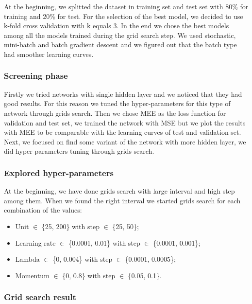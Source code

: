 At the beginning, we splitted the dataset in training set and test set with 80\% for training and 20\% for test. For the selection of the best model, we decided to use k-fold cross validation with k equals 3. In the end we chose the best models among all the models trained during the grid search step. We used stochastic, mini-batch and batch gradient descent and we figured out that the batch type had smoother learning curves.

\subsubsection{Screening phase}

Firstly we tried networks with single hidden layer and we noticed that they had good results. For this reason we tuned the hyper-parameters for this type of network through grids search.
Then we chose MEE as the loss function for validation and test set, we trained the network with MSE but we plot the results with MEE to be comparable with the learning curves of test and validation set.
Next, we focused on find some variant of the network with more hidden layer, we did hyper-parameters tuning through grids search.

\subsubsection{Explored hyper-parameters}
At the beginning, we have done grids search with large interval and high step among them. When we found the right interval we started grids search for each combination of the values:

\begin{itemize}
	\item Unit $\in$ \{25, 200\} with step $\in$ \{25, 50\};
	\item Learning rate $\in$ \{0.0001, 0.01\} with step $\in$ \{0.0001, 0.001\};
	\item Lambda $\in$ \{0, 0.004\} with step $\in$ \{0.0001,  0.0005\};
	\item Momentum $\in$ \{0, 0.8\} with step $\in$ \{0.05,  0.1\}.
\end{itemize}


\subsubsection{Grid search result}

